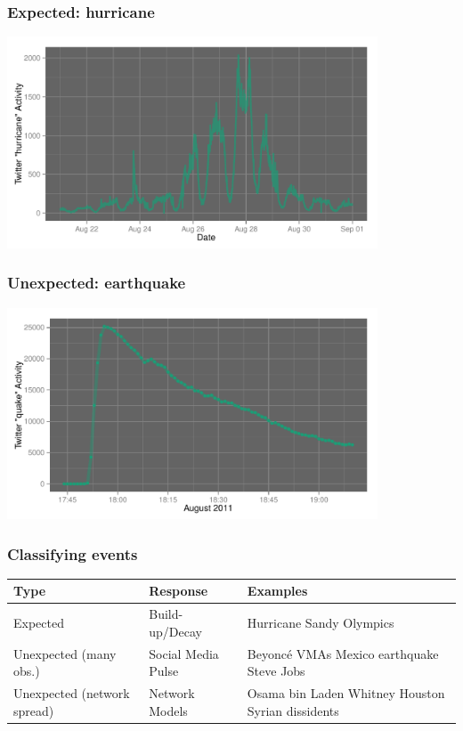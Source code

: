\documentclass{beamer}
\begin{document}



\begin{frame}\frametitle{Expected: hurricane}
  \begin{center}
    \includegraphics[width=11cm]{./imgs/SMP_hurricane.pdf}
  \end{center}
\end{frame}

\begin{frame}\frametitle{Unexpected: earthquake}
  \begin{center}
    \includegraphics[width=11cm]{./imgs/SMP_va_quake.pdf}
  \end{center}
\end{frame}



\begin{frame}\frametitle{Classifying events}
\begin{table}
\begin{tabular}{ m{2cm} | m{ 2.5cm} | m{4cm}}
\hline
Type & Response & Examples \\ \hline
Expected    &  Build-up/Decay & Hurricane Sandy \newline Olympics \\ \hline
Unexpected (many obs.) & Social Media \newline Pulse & Beyonc\'{e} VMAs \newline  Mexico earthquake \newline  Steve Jobs \\ \hline
Unexpected  (network spread) & Network \newline Models  & Osama bin Laden \newline  Whitney Houston \newline  Syrian dissidents \\ \hline
\end{tabular}
\end{table}
\end{frame}
\end{document}
